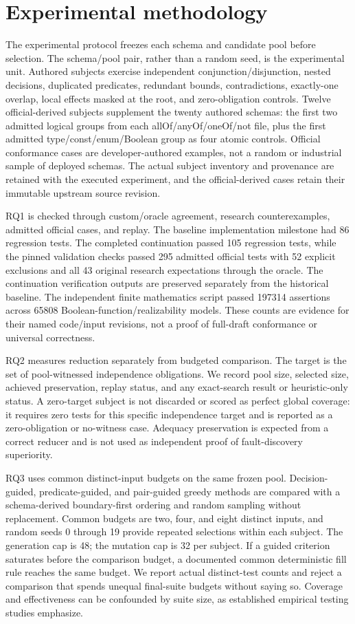 \documentclass[sigconf,nonacm]{acmart}
\begin{document}
\section{Experimental methodology}
The experimental protocol freezes each schema and candidate pool before selection. The schema/pool pair, rather than a random seed, is the experimental unit. Authored subjects exercise independent conjunction/disjunction, nested decisions, duplicated predicates, redundant bounds, contradictions, exactly-one overlap, local effects masked at the root, and zero-obligation controls. Twelve official-derived subjects supplement the twenty authored schemas: the first two admitted logical groups from each allOf/anyOf/oneOf/not file, plus the first admitted type/const/enum/Boolean group as four atomic controls. Official conformance cases are developer-authored examples, not a random or industrial sample of deployed schemas. The actual subject inventory and provenance are retained with the executed experiment, and the official-derived cases retain their immutable upstream source revision. \cite{ref18}

RQ1 is checked through custom/oracle agreement, research counterexamples, admitted official cases, and replay. The baseline implementation milestone had 86 regression tests. The completed continuation passed 105 regression tests, while the pinned validation checks passed 295 admitted official tests with 52 explicit exclusions and all 43 original research expectations through the oracle. The continuation verification outputs are preserved separately from the historical baseline. The independent finite mathematics script passed 197314 assertions across 65808 Boolean-function/realizability models. These counts are evidence for their named code/input revisions, not a proof of full-draft conformance or universal correctness.

RQ2 measures reduction separately from budgeted comparison. The target is the set of pool-witnessed independence obligations. We record pool size, selected size, achieved preservation, replay status, and any exact-search result or heuristic-only status. A zero-target subject is not discarded or scored as perfect global coverage: it requires zero tests for this specific independence target and is reported as a zero-obligation or no-witness case. Adequacy preservation is expected from a correct reducer and is not used as independent proof of fault-discovery superiority.

RQ3 uses common distinct-input budgets on the same frozen pool. Decision-guided, predicate-guided, and pair-guided greedy methods are compared with a schema-derived boundary-first ordering and random sampling without replacement. Common budgets are two, four, and eight distinct inputs, and random seeds 0 through 19 provide repeated selections within each subject. The generation cap is 48; the mutation cap is 32 per subject. If a guided criterion saturates before the comparison budget, a documented common deterministic fill rule reaches the same budget. We report actual distinct-test counts and reject a comparison that spends unequal final-suite budgets without saying so. Coverage and effectiveness can be confounded by suite size, as established empirical testing studies emphasize. \cite{ref14,ref15}
\end{document}
